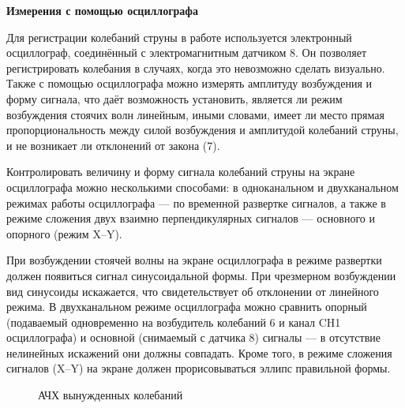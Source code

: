 \documentclass[14pt]{article}
\begin{document}
\vspace{1cm}
\textbf{Измерения с помощью осциллографа}

Для регистрации колебаний струны в работе используется электронный осциллограф, соединённый с электромагнитным датчиком 8. Он позволяет регистрировать колебания в случаях, когда это невозможно сделать визуально. Также с помощью осциллографа можно измерять амплитуду возбуждения и форму сигнала, что даёт возможность установить, является ли режим возбуждения стоячих волн линейным, иными словами, имеет ли место прямая пропорциональность между силой возбуждения и амплитудой колебаний струны, и не возникает ли отклонений от закона (7).

Контролировать величину и форму сигнала колебаний струны на экране осциллографа можно несколькими способами: в одноканальном и двухканальном режимах работы осциллографа — по временной развертке сигналов, а также в режиме сложения двух взаимно перпендикулярных сигналов — основного и опорного (режим X–Y).

При возбуждении стоячей волны на экране осциллографа в режиме развертки должен появиться сигнал синусоидальной формы. При чрезмерном возбуждении вид синусоиды искажается, что свидетельствует об отклонении от линейного режима. В двухканальном режиме осциллографа можно сравнить опорный (подаваемый одновременно на возбудитель колебаний 6 и канал CH1 осциллографа) и основной (снимаемый с датчика 8) сигналы --- в отсутствие нелинейных искажений они должны совпадать. Кроме того, в режиме сложения сигналов (X–Y) на экране должен прорисовываться эллипс правильной формы.

\begin{figure}[h!]
	\caption{АЧХ вынужденных колебаний}
	\label{fig:image}
\end{figure}
\end{document}

